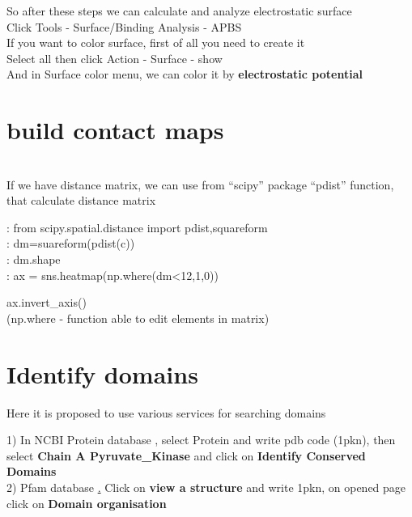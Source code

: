 \documentclass{article}
\begin{document}
So after these steps we can calculate and analyze electrostatic surface \\

Click Tools - Surface/Binding Analysis - APBS \\

If you want to color surface, first of all you need to create it \\

Select all then click Action - Surface - show \\

And in Surface color menu, we can color it by \textbf{electrostatic potential}







\section{build contact maps} \\

If we have distance matrix, we can use from ``scipy'' package ``pdist'' function, that calculate distance matrix

: from scipy.spatial.distance import pdist,squareform \\

: dm=suareform(pdist(c)) \\

: dm.shape \\

: ax = sns.heatmap(np.where(dm<12,1,0))       

  ax.invert\_axis() \\
  (np.where - function able to edit elements in matrix)







\section{Identify domains}

Here it is proposed to use various services for searching domains

1) In NCBI Protein database , select Protein and write pdb code (1pkn), then select \textbf{Chain A Pyruvate\_Kinase} and click on \textbf{Identify Conserved Domains}\\

2) Pfam database \href{http://pfam.xfam.org/}. Click on \textbf{view a structure} and write 1pkn, on opened page click on \textbf{Domain organisation}\\
\end{document}
